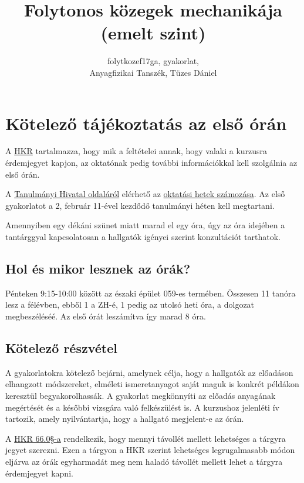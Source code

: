 \documentclass[12pt,a4paper]{scrartcl}
\begin{document}
\title{Folytonos közegek mechanikája\\(emelt szint)}
\author{folytkozef17ga, gyakorlat,\\Anyagfizikai Tanszék, Tüzes Dániel}
\maketitle
\tableofcontents
\section*{Kötelező tájékoztatás az első órán}
A \href{https://www.elte.hu/file/ELTE_SZMSZ_II.pdf}{HKR} tartalmazza, hogy mik a feltételei annak, hogy valaki a kurzusra érdemjegyet kapjon, az oktatónak pedig további információkkal kell szolgálnia az első órán.

A \href{http://to.ttk.elte.hu}{Tanulmányi Hivatal oldaláról} elérhető az \href{http://to.ttk.elte.hu/sites/default/files/201819_1_2fev_oktatasihetek_.xls}{oktatási hetek számozása}. Az első gyakorlatot a 2, február 11-ével kezdődő tanulmányi héten kell megtartani.

Amennyiben egy dékáni szünet miatt marad el egy óra, úgy az óra idejében a tantárggyal kapcsolatosan a hallgatók igényei szerint konzultációt tarthatok.

\subsection{Hol és mikor lesznek az órák?}
Pénteken 9:15-10:00 között az északi épület 059-es termében. Összesen 11 tanóra lesz a félévben, ebből 1 a ZH-é, 1 pedig az utolsó heti óra, a dolgozat megbeszéléséé. Az első órát leszámítva így marad 8 óra.

\subsection{Kötelező részvétel}
A gyakorlatokra kötelező bejárni, amelynek célja, hogy a hallgatók az előadáson elhangzott módszereket, elméleti ismeretanyagot saját maguk is konkrét példákon keresztül begyakorolhassák. A gyakorlat megkönnyíti az előadás anyagának megértését és a későbbi vizsgára való felkészülést is. A kurzushoz jelenléti ív tartozik, amely nyilvántartja, hogy a hallgató megjelent-e az órán.

A \href{https://www.elte.hu/file/ELTE_SZMSZ_II.pdf#page=59}{HKR 66.0§-a} rendelkezik, hogy mennyi távollét mellett lehetséges a tárgyra jegyet szerezni. Ezen a tárgyon a HKR szerint lehetséges legrugalmasabb módon eljárva az órák egyharmadát meg nem haladó távollét mellett lehet a tárgyra érdemjegyet kapni.
\end{document}
